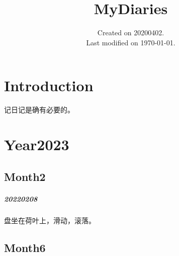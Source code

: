 \documentclass[UTF8]{Diaries}
\begin{document}
\title{MyDiaries}
\date{Created on 20200402.\\   Last modified on \today.}
\maketitle
\tableofcontents




\chapter{Introduction}

记日记是确有必要的。

\chapter{Year2023}
\section{Month2}
\paragraph{20220208}

盘坐在荷叶上，滑动，滚落。


\section{Month6}
\end{document}

